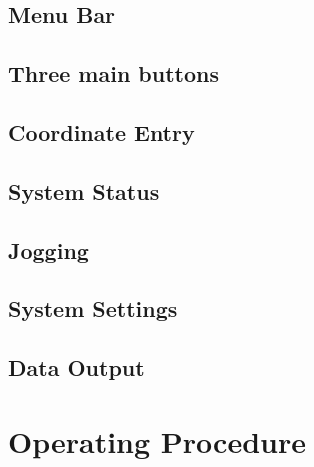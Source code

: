 \documentclass{article}
\begin{document}
\subsection{Menu Bar}
\subsection{Three main buttons}
\subsection{Coordinate Entry}
\subsection{System Status}
\subsection{Jogging}
\subsection{System Settings}
\subsection{Data Output}

\section{Operating Procedure}
\end{document}

